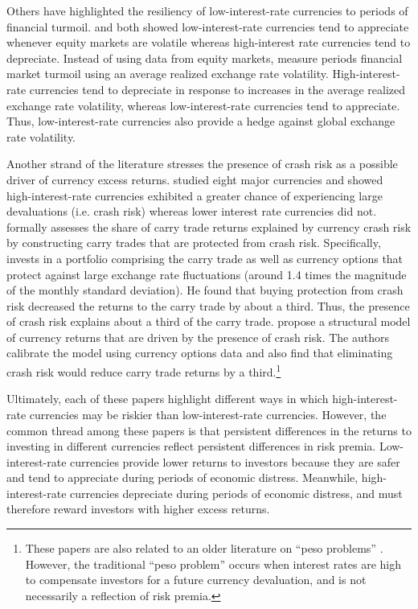 \documentclass{ar-1col}
\begin{document}
Others have highlighted the resiliency of low-interest-rate currencies to periods of financial turmoil. \citet{LustigRoussanovVerdelhan2011} and \citet{CampbellMedeirosViceira2010} both showed low-interest-rate currencies tend to appreciate whenever equity markets are volatile whereas high-interest rate currencies tend to depreciate. Instead of using data from equity markets, \citet{Menkhoffetal2012} measure periods financial market turmoil using an average realized exchange rate volatility. High-interest-rate currencies tend to depreciate in response to increases in the average realized exchange rate volatility, whereas low-interest-rate currencies tend to appreciate. Thus, low-interest-rate currencies also provide a hedge against global exchange rate volatility. 

Another strand of the literature stresses the presence of crash risk as a possible driver of currency excess returns. \citet{Brunnermeieretal2009} studied eight major currencies and showed high-interest-rate currencies exhibited a greater chance of experiencing large devaluations (i.e. crash risk) whereas lower interest rate currencies did not. \citet{Jurek2014} formally assesses the share of carry trade returns explained by currency crash risk by constructing carry trades that are protected from crash risk. Specifically, \citet{Jurek2014} invests in a portfolio comprising the carry trade as well as currency options that protect against large exchange rate fluctuations (around 1.4 times the magnitude of the monthly standard deviation). He found that buying protection from crash risk decreased the returns to the carry trade by about a third. Thus, the presence of crash risk explains about a third of the carry trade. \citet{Farhietal2015} propose a structural model of currency returns that are driven by the presence of crash risk. The authors calibrate the model using currency options data and also find that eliminating crash risk would reduce carry trade returns by a third.\footnote{These papers are also related to an older literature on ``peso problems'' \citep{Lewis2011}. However, the traditional ``peso problem'' occurs when interest rates are high to compensate investors for a future currency devaluation, and is not necessarily a reflection of risk premia.}

Ultimately, each of these papers highlight different ways in which high-interest-rate currencies may be riskier than low-interest-rate currencies. However, the common thread among these papers is that persistent differences in the returns to investing in different currencies reflect persistent differences in risk premia. Low-interest-rate currencies provide lower returns to investors because they are safer and tend to appreciate during periods of economic distress. Meanwhile, high-interest-rate currencies depreciate during periods of economic distress, and must therefore reward investors with higher excess returns.
\end{document}
